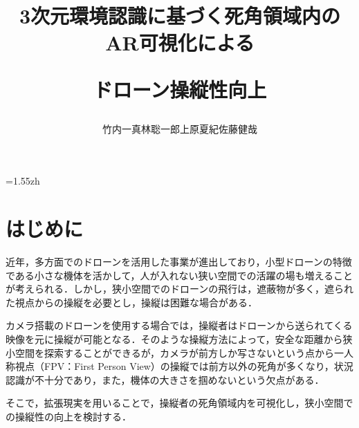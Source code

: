 \documentclass[a4j,10pt,twocolumn]{jarticle}
\title{3次元環境認識に基づく死角領域内のAR可視化による\par
ドローン操縦性向上}
\author{竹内一真\DAG \quad 林聡一郎\DDAG \quad 上原夏紀\DDAG \quad 佐藤健哉\DDAG}
\affiliation{\DAG 同志社大学理工学部情報システムデザイン学科\\ \DDAG 同志社大学大学院理工学研究科情報工学専攻}
\begin{document}
\maketitle              %
\makeetitle             %
\baselineskip=1.55zh   %

\section{はじめに}
近年，多方面でのドローンを活用した事業が進出しており，小型ドローンの特徴である小さな機体を活かして，人が入れない狭い空間での活躍の場も増えることが考えられる．しかし，狭小空間でのドローンの飛行は，遮蔽物が多く，遮られた視点からの操縦を必要とし，操縦は困難な場合がある．
\par
カメラ搭載のドローンを使用する場合では，操縦者はドローンから送られてくる映像を元に操縦が可能となる．そのような操縦方法によって，安全な距離から狭小空間を探索することができるが，カメラが前方しか写さないという点から一人称視点（FPV：First Person View）の操縦では前方以外の死角が多くなり，状況認識が不十分であり\cite{FPV}，また，機体の大きさを掴めないという欠点がある．
\par
そこで，拡張現実を用いることで，操縦者の死角領域内を可視化し，狭小空間での操縦性の向上を検討する．
\end{document}
